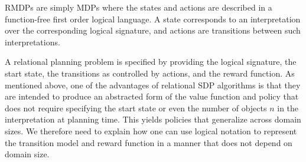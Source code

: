 RMDPs are simply MDPs where the states and actions are
described in a function-free first order logical language. 
%
%
%
%
A state corresponds to an interpretation over the corresponding logical signature, and actions are transitions between such interpretations.
%
%
%
%
%

A relational planning problem is specified by providing the logical
signature, the start state, the transitions as controlled by actions,
and the reward function.  As mentioned above, one of the advantages of
relational SDP algorithms is that they are intended to produce an
abstracted form of the value function and policy that does not require
specifying the start state or even
the number of objects $n$ in the interpretation at planning
time.  This yields policies that generalize across domain sizes.  
We therefore need to explain how one can use logical notation to represent the
transition model and reward function in a manner that does not depend on domain size. 

%
%

%
%
%
%
%
%
%
%


%
%
%
%
%
%

%

